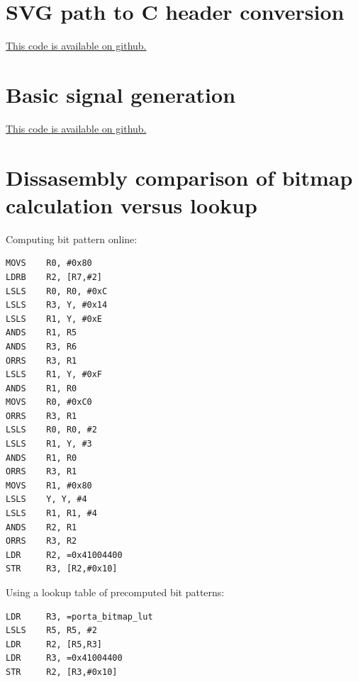 \documentclass[12pt]{article}
\begin{document}
\newpage
\begin{appendices}
\section{SVG path to C header conversion}
\label{appendix:svg2header}
\href{https://github.com/trupples/oscilloscope-graphics/blob/main/convert-svg-to-header.js}{This code is available on github.}


\newpage
\section{Basic signal generation}
\label{appendix:staticvector}
\href{https://github.com/trupples/oscilloscope-graphics/blob/main/static-vector/static-vector.ino}{This code is available on github.}


\newpage
\section{Dissasembly comparison of bitmap calculation versus lookup}
\label{appendix:lutoptimisation}

\begin{multicols}{2}

\noindent Computing bit pattern online:
\begin{lstlisting}
MOVS    R0, #0x80
LDRB    R2, [R7,#2]
LSLS    R0, R0, #0xC
LSLS    R3, Y, #0x14
LSLS    R1, Y, #0xE
ANDS    R1, R5
ANDS    R3, R6
ORRS    R3, R1
LSLS    R1, Y, #0xF
ANDS    R1, R0
MOVS    R0, #0xC0
ORRS    R3, R1
LSLS    R0, R0, #2
LSLS    R1, Y, #3
ANDS    R1, R0
ORRS    R3, R1
MOVS    R1, #0x80
LSLS    Y, Y, #4
LSLS    R1, R1, #4
ANDS    R2, R1
ORRS    R3, R2
LDR     R2, =0x41004400
STR     R3, [R2,#0x10]
\end{lstlisting}

\columnbreak
\noindent Using a lookup table of precomputed bit patterns:

\begin{lstlisting}
LDR     R3, =porta_bitmap_lut
LSLS    R5, R5, #2
LDR     R2, [R5,R3]
LDR     R3, =0x41004400
STR     R2, [R3,#0x10]
\end{lstlisting}

\end{multicols}

\end{appendices}
\end{document}
